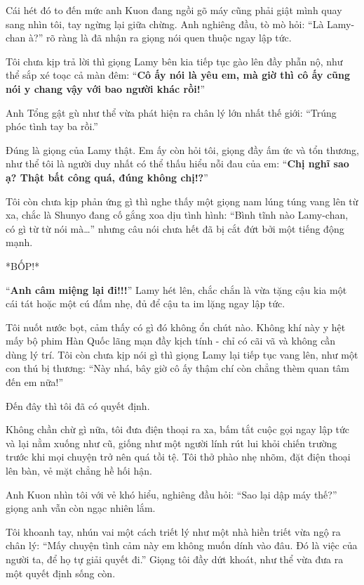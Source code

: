 \documentclass[../main.tex]{subfiles}
\begin{document}
Cái hét đó to đến mức anh Kuon đang ngồi gõ máy cũng phải giật mình quay sang nhìn tôi, tay ngừng lại giữa chừng. Anh nghiêng đầu, tò mò hỏi: ``Là Lamy-chan à?'' rõ ràng là đã nhận ra giọng nói quen thuộc ngay lập tức.

Tôi chưa kịp trả lời thì giọng Lamy bên kia tiếp tục gào lên đầy phẫn nộ, như thể sắp xé toạc cả màn đêm: ``\textbf{Cô ấy nói là yêu em, mà giờ thì cô ấy cũng nói y chang vậy với bao người khác rồi!}''

Anh Tổng gật gù như thể vừa phát hiện ra chân lý lớn nhất thế giới: ``Trúng phóc tình tay ba rồi.''

Đúng là giọng của Lamy thật. Em ấy còn hỏi tôi, giọng đầy ấm ức và tổn thương, như thể tôi là người duy nhất có thể thấu hiểu nỗi đau của em: ``\textbf{Chị nghĩ sao ạ? Thật bất công quá, đúng không chị!?}''

Tôi còn chưa kịp phản ứng gì thì nghe thấy một giọng nam lúng túng vang lên từ xa, chắc là Shunyo đang cố gắng xoa dịu tình hình: ``Bình tĩnh nào Lamy-chan, có gì từ từ nói mà\dots'' nhưng câu nói chưa hết đã bị cắt đứt bởi một tiếng động mạnh.

*BỐP!*

``\textbf{Anh câm miệng lại đi!!!}'' Lamy hét lên, chắc chắn là vừa tặng cậu kia một cái tát hoặc một cú đấm nhẹ, đủ để cậu ta im lặng ngay lập tức.

Tôi nuốt nước bọt, cảm thấy có gì đó không ổn chút nào. Không khí này y hệt mấy bộ phim Hàn Quốc lãng mạn đầy kịch tính - chỉ có cãi vã và không cần dùng lý trí. Tôi còn chưa kịp nói gì thì giọng Lamy lại tiếp tục vang lên, như một con thú bị thương: ``Này nhá, bây giờ cô ấy thậm chí còn chẳng thèm quan tâm đến em nữa!''

Đến đây thì tôi đã có quyết định.

Không chần chừ gì nữa, tôi đưa điện thoại ra xa, bấm tắt cuộc gọi ngay lập tức và lại nằm xuống như cũ, giống như một người lính rút lui khỏi chiến trường trước khi mọi chuyện trở nên quá tồi tệ. Tôi thở phào nhẹ nhõm, đặt điện thoại lên bàn, vẻ mặt chẳng hề hối hận.

Anh Kuon nhìn tôi với vẻ khó hiểu, nghiêng đầu hỏi: ``Sao lại dập máy thế?'' giọng anh vẫn còn ngạc nhiên lắm.

Tôi khoanh tay, nhún vai một cách triết lý như một nhà hiền triết vừa ngộ ra chân lý: ``Mấy chuyện tình cảm này em không muốn dính vào đâu. Đó là việc của người ta, để họ tự giải quyết đi.'' Giọng tôi đầy dứt khoát, như thể vừa đưa ra một quyết định sống còn.
\end{document}

